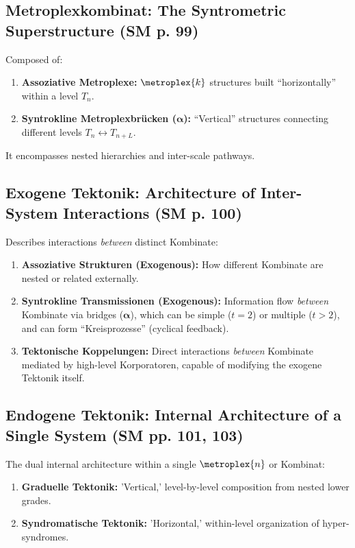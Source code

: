 \documentclass[
    12pt,              %
    a4paper,           %
    headings=normal,   %
    twoside=true,      %
    BCOR=8mm,          %
]{scrbook}
\newcommand{\q}[1]{\enquote{#1}}
\newcommand{\metroplextotalitaet}[1]{T_{#1}}
\begin{document}
\subsection{Metroplexkombinat: The Syntrometric Superstructure (SM p. 99)}
\label{sec:ch5_kombinat_superstructure}
Composed of:
\begin{enumerate}
    \item  \textbf{Assoziative Metroplexe:} \(\metroplex{k}\) structures built \q{horizontally} within a level \(\metroplextotalitaet{n}\).
    \item  \textbf{Syntrokline Metroplexbrücken (\(\bm{\alpha}\)):} \q{Vertical} structures connecting different levels \(\metroplextotalitaet{n} \leftrightarrow \metroplextotalitaet{n+L}\).
\end{enumerate}
It encompasses nested hierarchies and inter-scale pathways.

\subsection{Exogene Tektonik: Architecture of Inter-System Interactions (SM p. 100)}
\label{sec:ch5_exogene_tektonik}
Describes interactions \textit{between} distinct Kombinate:
\begin{enumerate}
    \item  \textbf{Assoziative Strukturen (Exogenous):} How different Kombinate are nested or related externally.
    \item  \textbf{Syntrokline Transmissionen (Exogenous):} Information flow \textit{between} Kombinate via bridges (\(\bm{\alpha}\)), which can be simple (\(t=2\)) or multiple (\(t>2\)), and can form \q{Kreisprozesse} (cyclical feedback).
    \item  \textbf{Tektonische Koppelungen:} Direct interactions \textit{between} Kombinate mediated by high-level Korporatoren, capable of modifying the exogene Tektonik itself.
\end{enumerate}

\subsection{Endogene Tektonik: Internal Architecture of a Single System (SM pp. 101, 103)}
\label{sec:ch5_endogene_tektonik}
The dual internal architecture within a single \(\metroplex{n}\) or Kombinat:
\begin{enumerate}
    \item  \textbf{Graduelle Tektonik:} 'Vertical,' level-by-level composition from nested lower grades.
    \item  \textbf{Syndromatische Tektonik:} 'Horizontal,' within-level organization of hyper-syndromes.
\end{enumerate}
\end{document}
